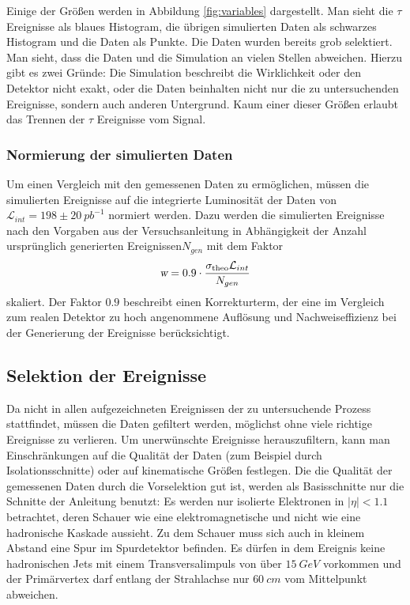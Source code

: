 \documentclass[a4paper,12pt]{article}
\begin{document}
Einige der Größen werden in Abbildung \ref{fig:variables} dargestellt. Man sieht die $τ$ Ereignisse
als blaues Histogram, die übrigen simulierten Daten als schwarzes Histogram und die Daten als
Punkte. Die Daten wurden bereits grob selektiert. Man sieht, dass die Daten und die Simulation an
vielen Stellen abweichen. Hierzu gibt es zwei Gründe: Die Simulation beschreibt die Wirklichkeit
oder den Detektor nicht exakt, oder die Daten beinhalten nicht nur die zu untersuchenden Ereignisse,
sondern auch anderen Untergrund. Kaum einer dieser Größen erlaubt das Trennen der $τ$ Ereignisse vom
Signal.
\subsubsection*{Normierung der simulierten Daten}
Um einen Vergleich mit den gemessenen Daten zu ermöglichen, müssen die simulierten Ereignisse auf
die 
integrierte Luminosität der Daten von $\mathcal{L}_{int}=198 \pm \SI{20}{pb^{-1}}$ normiert werden.
Dazu werden die simulierten Ereignisse nach den Vorgaben aus der Versuchsanleitung\cite{versuchsanleitung}
in Abhängigkeit der Anzahl ursprünglich generierten Ereignissen$N_{gen}$ mit dem Faktor
\begin{align*}
	\textsl{w}= 0.9 \cdot \frac{\sigma_\text{theo} \mathcal{L}_{int}}{N_{gen}}
\end{align*}
skaliert. Der Faktor $0.9$ beschreibt einen Korrekturterm, der eine im Vergleich zum realen Detektor
zu hoch angenommene Auflösung und Nachweiseffizienz bei der Generierung der Ereignisse berücksichtigt.


\subsection{Selektion der Ereignisse}
Da nicht in allen aufgezeichneten Ereignissen der zu untersuchende Prozess stattfindet, müssen die
Daten gefiltert werden, möglichst ohne viele richtige Ereignisse zu verlieren.
Um unerwünschte Ereignisse herauszufiltern, kann man Einschränkungen auf die Qualität der Daten (zum Beispiel
durch Isolationsschnitte) oder auf kinematische Größen festlegen.
Die die Qualität der gemessenen Daten durch die Vorselektion gut ist, werden als Basisschnitte nur
die Schnitte der Anleitung benutzt: Es werden nur isolierte
Elektronen  in $|η|<1.1$ betrachtet, deren Schauer wie eine elektromagnetische und nicht wie eine hadronische
Kaskade aussieht. Zu dem Schauer muss sich auch in kleinem Abstand eine Spur im Spurdetektor befinden.
Es dürfen in dem Ereignis keine
hadronischen Jets mit einem Transversalimpuls von über $\SI{15}{GeV}$ vorkommen und der Primärvertex
darf entlang der Strahlachse nur $\SI{60}{cm}$ vom Mittelpunkt abweichen.
\end{document}

